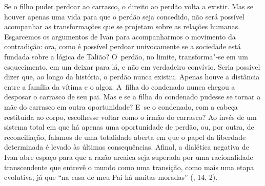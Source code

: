 Se o filho puder perdoar ao carrasco, o direito ao perdão volta a
existir. Mas se houver apenas uma vida para que o perdão seja concedido,
não será possível acompanhar as transformações que se projetam sobre as
relações humanas. Esgarcemos os argumentos de Ivan para acompanharmos o
movimento da contradição: ora, como é possível perdoar univocamente se a
sociedade está fundada sobre a lógica de Talião? O~perdão, no limite,
transforma"-se em um esquecimento, em um deixar para lá, e não em
verdadeiro convívio. Seria possível dizer que, ao longo da história, o
perdão nunca existiu. Apenas houve a distância entre a família da vítima
e o algoz. A~filha do condenado nunca chegou a desposar o carrasco de
seu pai. Mas e se a filha do condenado pudesse se tornar a mãe do
carrasco em outra oportunidade? E~se o condenado, com a cabeça
restituída ao corpo, escolhesse voltar como o irmão do carrasco? Ao
invés de um sistema total em que há apenas uma oportunidade de perdão,
ou, por outra, de reconciliação, falamos de uma totalidade aberta em que
o papel da liberdade determinada é levado às últimas consequências.
Afinal, a dialética negativa de Ivan abre espaço para que a razão
arcaica seja superada por uma racionalidade transcendente que entrevê o
mundo como uma transição, como mais uma etapa evolutiva, já que ``na
casa de meu Pai há muitas moradas'' (, 14, 2).

